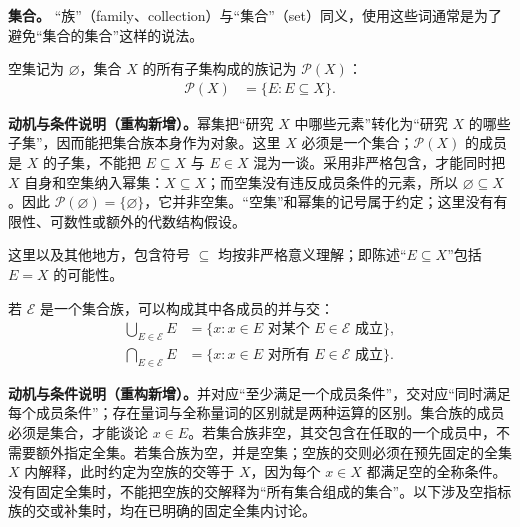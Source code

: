 \documentclass[../../main.tex]{subfiles}%
\begin{document}
\textbf{集合。} “族”（family、collection）与“集合”（set）同义，使用这些词通常是为了避免“集合的集合”这样的说法。
\begin{definition}[集合及其子集族]\label{definition:ch00-sets-power-set}
空集记为 $\varnothing$，集合 $X$ 的所有子集构成的族记为 $\mathscr{P}(X)$：
\begin{align*}
\mathscr{P}(X)&=\{E:E\subseteq X\}.
\end{align*}
\end{definition}
\begin{remark}
\textbf{动机与条件说明（重构新增）。}幂集把“研究 $X$ 中哪些元素”转化为“研究 $X$ 的哪些子集”，因而能把集合族本身作为对象。这里 $X$ 必须是一个集合；$\mathscr{P}(X)$ 的成员是 $X$ 的子集，不能把 $E\subseteq X$ 与 $E\in X$ 混为一谈。采用非严格包含，才能同时把 $X$ 自身和空集纳入幂集：$X\subseteq X$；而空集没有违反成员条件的元素，所以 $\varnothing\subseteq X$。因此 $\mathscr{P}(\varnothing)=\{\varnothing\}$，它并非空集。“空集”和幂集的记号属于约定；这里没有有限性、可数性或额外的代数结构假设。
\end{remark}


这里以及其他地方，包含符号 $\subseteq$ 均按非严格意义理解；即陈述“$E\subseteq X$”包括 $E=X$ 的可能性。


\begin{definition}[集合族的并与交]\label{definition:ch00-union-intersection}
若 $\mathscr{E}$ 是一个集合族，可以构成其中各成员的并与交：
\begin{align*}
\bigcup_{E\in\mathscr{E}}E&=\{x:x\in E\text{ 对某个 }E\in\mathscr{E}\text{ 成立}\},\\
\bigcap_{E\in\mathscr{E}}E&=\{x:x\in E\text{ 对所有 }E\in\mathscr{E}\text{ 成立}\}.
\end{align*}
\end{definition}
\begin{remark}
\textbf{动机与条件说明（重构新增）。}并对应“至少满足一个成员条件”，交对应“同时满足每个成员条件”；存在量词与全称量词的区别就是两种运算的区别。集合族的成员必须是集合，才能谈论 $x\in E$。若集合族非空，其交包含在任取的一个成员中，不需要额外指定全集。若集合族为空，并是空集；空族的交则必须在预先固定的全集 $X$ 内解释，此时约定为空族的交等于 $X$，因为每个 $x\in X$ 都满足空的全称条件。没有固定全集时，不能把空族的交解释为“所有集合组成的集合”。以下涉及空指标族的交或补集时，均在已明确的固定全集内讨论。
\end{remark}
\end{document}
